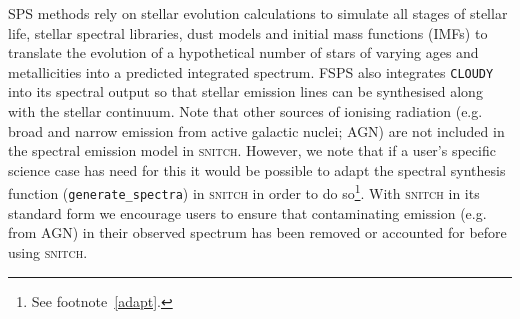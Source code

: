 \documentclass[useAMS,usenatbib]{mn2e}
\def\referee		{\color{refer}}
\begin{document}
SPS methods rely on stellar evolution calculations to simulate all stages of stellar life, stellar spectral libraries, dust models and initial mass functions (IMFs) to translate the evolution of a hypothetical number of stars of varying ages and metallicities into a predicted integrated spectrum. FSPS also integrates \texttt{CLOUDY} \citep{ferland13} into its spectral output so that stellar emission lines can be synthesised along with the stellar continuum. {\referee Note that other sources of ionising radiation (e.g. broad and narrow emission from active galactic nuclei; AGN) are not included in the spectral emission model in \textsc{snitch}. However, we note that if a user's specific science case has need for this it would be possible to adapt the spectral synthesis function (\texttt{generate\_spectra}) in \textsc{snitch} in order to do so\footnote{See footnote~\ref{adapt}.}. With \textsc{snitch} in its standard form we encourage users to ensure that contaminating emission (e.g. from AGN) in their observed spectrum has been removed or accounted for before using \textsc{snitch}.}


\end{document}
